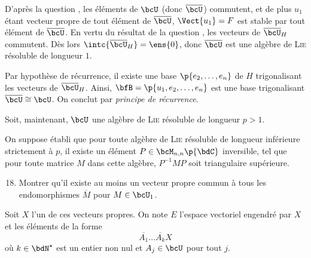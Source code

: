 \documentclass[a4paper,french,bookmarks]{article}
\begin{document}
\begin{enumerate}
\begin{nproof}
            D'après la question , les éléments de $\bcU$ (donc $\overline{\bcU}$) commutent, et de plus $u_1$ étant vecteur propre de tout élément de $\overline \bcU$, $\Vect{u_1} = F$ est stable par tout élément de $\overline \bcU$. En vertu du résultat de la question , les vecteurs de $\overline \bcU_H$ commutent. Dès lors $\intc{\overline \bcU_H} = \ens{0}$, donc $\overline \bcU$ est une algèbre de \textsc{Lie} résoluble de longueur $1$.
            
            Par hypothèse de récurrence, il existe une base $\p{e_2, \dots, e_n}$ de $H$ trigonalisant les vecteurs de $\overline \bcU_H$. Ainsi, $\bfB = \p{u_1, e_2, \dots, e_n}$ est une base trigonalisant $\overline \bcU \cong \bcU$. On conclut par \emph{principe de récurrence}.
        \end{nproof}
        
    \end{enumerate}
    
    Soit, maintenant, $\bcU$ une algèbre de \textsc{Lie} résoluble de longueur $p > 1$.
    
    On suppose établi que pour toute algèbre de \textsc{Lie} résoluble de longueur inférieure strictement à $p$, il existe un élément $P \in \bcM_{n, n}\p{\bdC}$ inversible, tel que pour toute matrice $M$ dans cette algèbre, $P^{-1}MP$ soit triangulaire supérieure.
    
    \begin{enumerate}
        \setcounter{enumi}{17}
        \item Montrer qu'il existe au moins un vecteur propre commun à tous les endomorphismes $\overline{M}$ pour $M \in \bcU_1$.
        
    \end{enumerate}
    
    Soit $X$ l'un de ces vecteurs propres. On note $E$ l'espace vectoriel engendré par $X$ et les éléments de la forme 
    \[ \overline{A_1}\dots\overline{A_k}X \]
    où $k \in \bdN^\star$ est un entier non nul et $A_j \in \bcU$ pour tout $j$.
    
\end{document}
